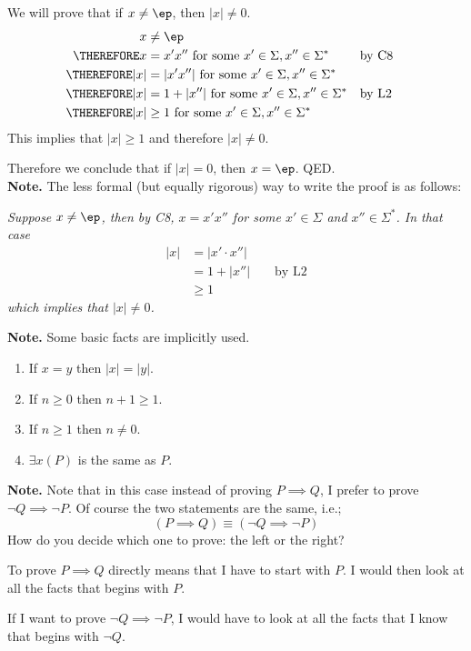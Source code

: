 We will prove that if $x \neq \ep$, then $|x| \neq 0$.
\begin{align*}
x &\neq \ep \\
\THEREFORE x &= x'x'' \text{ for some } x' \in \Sigma, x'' \in \Sigma^*
           & & \text{by C8} \\
\THEREFORE |x| &= |x' x''| \text{ for some } x' \in \Sigma, x'' \in \Sigma^* 
           \\ 
\THEREFORE |x| &= 1 + |x''| \text{ for some } x' \in \Sigma, x'' \in \Sigma^*
           & & \text{by L2} \\
\THEREFORE |x| &\geq 1 \text{ for some } x' \in \Sigma, x'' \in \Sigma^* 
\end{align*}
This implies that $|x| \geq 1$ and therefore $|x| \neq 0$.

Therefore we conclude that if $|x| = 0$, then $x = \ep$. QED.
\\

{\bf Note.}
The less formal (but equally rigorous) way to write the proof is as follows:

{\it 
Suppose $x \neq \ep$, then by C8, $x = x'x''$ 
for some $x' \in \Sigma$ and $x'' \in \Sigma^*$.
In that case
\begin{align*}
|x| 
&= |x' \cdot x''| \\ 
&= 1 + |x''| & & \text{ by L2}    \\
&\geq 1
\end{align*}
which implies that $|x| \neq 0$.
}

{\bf Note.}
Some basic facts are implicitly used.
\begin{enumerate}
\item If $x = y$ then $|x|= |y|$. 
\item If $n \geq 0$ then $n + 1 \geq 1$.
\item If $n \geq 1$ then $ n \neq 0$.
\item $\exists x(P)$ is the same as $P$.
\end{enumerate}

{\bf Note.}
Note that in this case instead of proving $P \implies Q$,
I prefer to prove $\lnot Q \implies \lnot P$.
Of course the two statements are the same, i.e.;
\[
(P \implies Q) \equiv (\lnot Q \implies \lnot P)
\]
How do you decide which one to prove: the left or the right?

To prove $P \implies Q$ directly means that I have to start with $P$.
I would then look at all the facts that begins with $P$.

If I want to prove $\lnot Q \implies \lnot P$, I would have to 
look at all the facts that I know that begins with $\lnot Q$.

